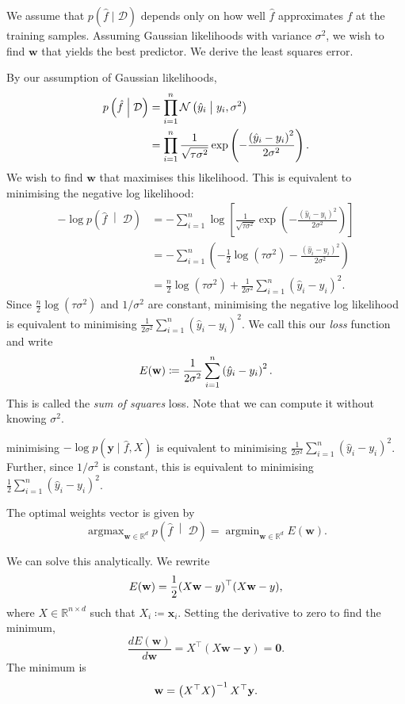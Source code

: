 \documentclass[11pt,twoside,openright]{report}
\newcommand\bbR{\mathbb{R}}
\newcommand\bw{\mathbf{w}}
\newcommand\bx{\mathbf{x}}
\newcommand\by{\mathbf{y}}
\newcommand\cD{\mathcal{D}}
\newcommand\cN{\mathcal{N}}
\DeclareMathOperator*{\argmax}{argmax}
\DeclareMathOperator*{\argmin}{argmin}
\begin{document}
We assume that $p(\hat f \mid \cD)$ depends only on how well $\hat f$ approximates $f$ at the training samples. Assuming Gaussian likelihoods with variance $\sigma^2$, we wish to find $\bw$ that yields the best predictor. We derive the least squares error.

By our assumption of Gaussian likelihoods, \begin{align}
    p\left(\hat f \;\middle|\; \cD\right) &= \prod_{i = 1}^{n} \cN\left(\hat y_i \;\middle|\; y_i, \sigma^2\right) \label{eq:linearlikelihood} \\
    &= \prod_{i = 1}^{n} \frac{1}{\sqrt{\tau\sigma^2}} \exp\left(-\frac{\left(\hat y_i - y_i\right)^2}{2\sigma^2}\right) \text. \nonumber
\end{align} We wish to find $\bw$ that maximises this likelihood. This is equivalent to minimising the negative log likelihood:\begin{align*}
    -\log p\left(\hat f \;\middle|\; \cD\right)
    &= - \sum_{i = 1}^{n} \log\left[\frac{1}{\sqrt{\tau\sigma^2}} \exp\left(-\frac{\left(\hat y_i - y_i\right)^2}{2\sigma^2}\right)\right] \\
    &= - \sum_{i = 1}^{n} \left(-\frac{1}{2}\log\left(\tau\sigma^2\right) -\frac{\left(\hat y_i - y_i\right)^2}{2\sigma^2}\right) \\
    &=  \frac{n}{2}\log\left(\tau\sigma^2\right) + \frac{1}{2\sigma^2}\sum_{i = 1}^{n}\left(\hat y_i - y_i\right)^2 \text{.}
\end{align*} Since $\frac{n}{2}\log(\tau\sigma^2)$ and $1/\sigma^2$ are constant, minimising the negative log likelihood is equivalent to minimising $\frac{1}{2\sigma^2}\sum_{i = 1}^{n}(\hat y_i - y_i)^2$. We call this our \emph{loss} function and write \[
  E(\bw) \coloneqq \frac{1}{2\sigma^2}\sum_{i = 1}^{n}\left(\hat y_i - y_i\right)^2 \text.
\] This is called the \emph{sum of squares} loss. Note that we can compute it without knowing $\sigma^2$.

 minimising $-\log p(\by \mid \hat f, X)$ is equivalent to minimising $\frac{1}{2\sigma^2}\sum_{i = 1}^{n}(\hat y_i - y_i)^2$. Further, since $1/\sigma^2$ is constant, this is equivalent to minimising $\frac12\sum_{i = 1}^{n}(\hat y_i - y_i)^2$.

The optimal weights vector is given by \[
    \argmax_{\bw \in \bbR^d} p\left(\hat f \;\middle|\; \cD\right) = \argmin_{\bw \in \bbR^d} E(\bw) \text{.}
\]

We can solve this analytically. We rewrite \[
  E(\bw) = \frac12(X\bw - y)^\top(X\bw - y) \text,
\] where $X \in \bbR^{n\times d}$ such that $X_i \coloneqq \bx_i$. Setting the derivative to zero to find the minimum, \[
    \frac{dE(\bw)}{d\bw} = X^\top (X\bw - \by) = \mathbf{0} \text{.}
\] The minimum is \[
    \bw  = \left(X^\top X\right)^{-1}X^\top\by \text.
\]
\end{document}
